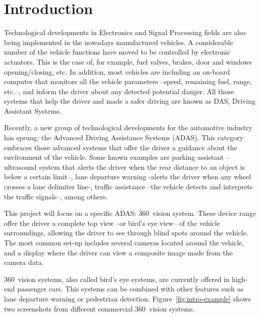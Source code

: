\chapter{Introduction}



Technological developments in Electronics and Signal Processing fields are also being implemented in the nowadays manufactured vehicles. A considerable number of the vehicle functions have moved to be controlled by electronic actuators. This is the case of, for example, fuel valves, brakes, door and windows opening/closing, etc. In addition, most vehicles are including an on-board computer that monitors all the vehicle parameters --speed, remaining fuel, range, etc.--, and inform the driver about any detected potential danger. All those systems that help the driver and made a safer driving are known as DAS, Driving Assistant Systems.

Recently, a new group of technological   developments for the automotive industry has sprung: the Advanced Driving Assistance Systems (ADAS). This category embraces those advanced systems that offer the driver a guidance about the environment of the vehicle. Some known examples are parking assistant --ultrasound system that alerts the driver when the rear distance to an object is below a certain limit--, lane departure warning -alerts the driver when any wheel crosses a lane delimiter line-, traffic assistance --the vehicle detects and interprets the traffic signals--, among others.

This project will focus on a specific ADAS: 360\degree~vision system. These device range offer the driver a complete top view --or bird's eye view-- of the vehicle surroundings, allowing the driver to see through blind spots around the vehicle. The most common set-up  includes several cameras located around the vehicle, and a display where the driver can view a composite image made from the camera data.  

360\degree~vision systems, also called bird's eye systems, are currently offered in high-end passenger cars. This systems can be combined with other features such as lane departure warning or pedestrian detection. Figure~\ref{fig:intro-example} shows two screenshots from different commercial 360\degree~vision systems. 

